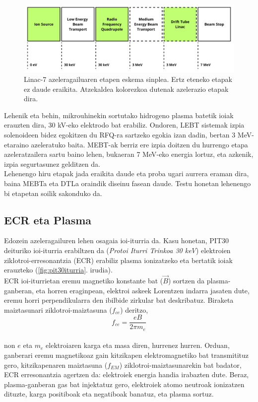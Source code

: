 \documentclass[12pt]{article}
\numberwithin{figure}{section}
\numberwithin{equation}{section}
\begin{document}
\begin{figure}[h]
    \centering
    \includegraphics[width=\linewidth]{1 - Sarrera/etapas linac7.png}
    \caption{Linac-7 azeleragailuaren etapen eskema sinplea. Ertz eteneko etapak ez daude eraikita. Atzekaldea kolorezkoa dutenak azelerazio etapak dira.}
    \label{fig:linac7etapak}
\end{figure}
Lehenik eta behin, mikrouhinekin sortutako hidrogeno plasma batetik ioiak erauzten dira, 30 kV-eko elektrodo bat erabiliz. Ondoren, LEBT sistemak izpia solenoideen bidez egokitzen du RFQ-ra sartzeko egokia izan dadin, bertan 3 MeV-etaraino azeleratuko baita. MEBT-ak berriz ere izpia doitzen du hurrengo etapa azeleratzailera sartu baino lehen, bukaeran 7 MeV-eko energia lortuz, eta azkenik, izpia segurtasunez gelditzen da.\\

Lehenengo hiru etapak jada eraikita daude eta proba ugari aurrera eraman dira, baina MEBTa eta DTLa oraindik diseinu fasean daude. Testu honetan lehenengo bi etapetan soilik sakonduko da.

\subsection{ECR eta Plasma}
\label{sec:ecrplasma}

Edozein azeleragailuren lehen osagaia ioi-iturria da. Kasu honetan, PIT30 deituriko ioi-iturria erabiltzen da (\textit{Protoi Iturri Trinkoa 30 keV}) \cite{elorza_romera_pit30_2021} elektroien ziklotroi-erresonantzia (ECR) erabiliz plasma ionizatzeko eta bertatik ioiak erauzteko (\ref{fig:pit30iturria}. irudia). \\

ECR ioi-iturrietan eremu magnetiko konstante bat ($\Vec{B}$) sortzen da plasma\hyp{}ganberan, eta horren eraginpean, elektroi askeek Lorentzen indarra jasaten dute, eremu horri perpendikularra den ibilbide zirkular bat deskribatuz. Biraketa maiztasunari ziklotroi-maiztasuna ($f_{ce}$) deritzo,\\

\begin{equation}
    f_{ce} = \frac{eB}{2\pi m_{e}}
\label{eq:ziklotroi}
\end{equation}
\\
non $e$ eta $m_e$ elektroiaren karga eta masa diren, hurrenez hurren. Orduan, ganberari eremu magnetikoaz gain kitzikapen elektromagnetiko bat transmitituz gero, kitzikapenaren maiztasuna ($f_{EM}$) ziklotroi-maiztasunarekin bat badator, ECR erresonantzia agertzen da: elektroiek energia handia irabazten dute. Beraz, plasma-ganberan gas bat injektatuz gero, elektroiek atomo neutroak ionizatzen dituzte, karga positiboak eta negatiboak banatuz, eta plasma sortuz.
\end{document}
